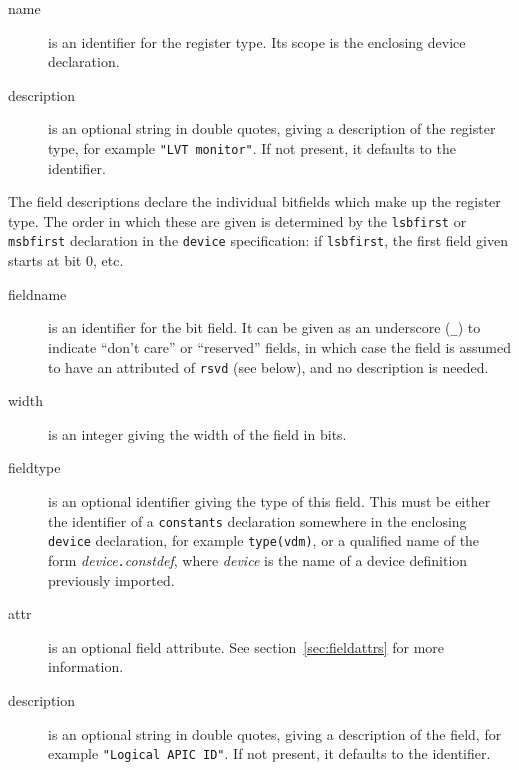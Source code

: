 \documentclass[a4paper,11pt,twoside]{report}
\begin{document}
\begin{description}

\item[name] is an identifier for the register type.  Its scope is the
  enclosing device declaration. 

\item[description] is an optional string in double quotes, giving a
  description of the register type, for example \texttt{"LVT
    monitor"}.   If not present, it defaults to the identifier.  

\end{description}

The field descriptions declare the individual bitfields which make up
the register type.  The order in which these are given is determined
by the \texttt{lsbfirst} or \texttt{msbfirst} declaration in the
\texttt{device} specification: if \texttt{lsbfirst}, the first field
given starts at bit 0, etc.

\begin{description}

\item[fieldname] is an identifier for the bit field.  It can be
  given as an underscore (\texttt{\_}) to indicate ``don't care'' or
  ``reserved'' fields, in which case the field is
  assumed to have an attributed of \texttt{rsvd} (see below), and no
  description is needed. 

\item[width] is an integer giving the width of the field in bits. 

\item[fieldtype] is an optional identifier giving the type of this field.
  This must be either the identifier of a \texttt{constants} declaration
  somewhere in the enclosing \texttt{device} declaration, for example
  \texttt{type(vdm)}, or a qualified name of the form
  \textit{device}\texttt{.}\textit{constdef}, where \textit{device} is
  the name of a device definition previously imported. 

\item[attr] is an optional field
  attribute.  See section~\ref{sec:fieldattrs} for more information. 

\item[description] is an optional string in double quotes, giving a
  description of the field, for example \texttt{"Logical APIC ID"}. 
  If not present, it defaults to the identifier.  

\end{description}
\end{document}
